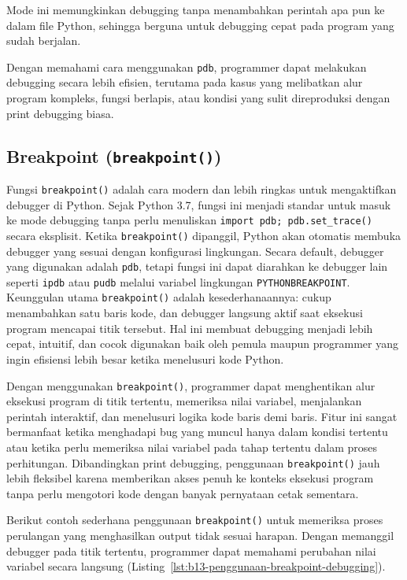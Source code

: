 Mode ini memungkinkan debugging tanpa menambahkan perintah apa pun ke dalam file Python, sehingga berguna untuk debugging cepat pada program yang sudah berjalan.

Dengan memahami cara menggunakan \texttt{pdb}, programmer dapat melakukan debugging secara lebih efisien, terutama pada kasus yang melibatkan alur program kompleks, fungsi berlapis, atau kondisi yang sulit direproduksi dengan print debugging biasa.

\subsection{Breakpoint (\texttt{breakpoint()})}

Fungsi \texttt{breakpoint()} adalah cara modern dan lebih ringkas untuk mengaktifkan debugger di Python. Sejak Python 3.7, fungsi ini menjadi standar untuk masuk ke mode debugging tanpa perlu menuliskan \texttt{import pdb; pdb.set\_trace()} secara eksplisit. Ketika \texttt{breakpoint()} dipanggil, Python akan otomatis membuka debugger yang sesuai dengan konfigurasi lingkungan. Secara default, debugger yang digunakan adalah \texttt{pdb}, tetapi fungsi ini dapat diarahkan ke debugger lain seperti \texttt{ipdb} atau \texttt{pudb} melalui variabel lingkungan \texttt{PYTHONBREAKPOINT}. Keunggulan utama \texttt{breakpoint()} adalah kesederhanaannya: cukup menambahkan satu baris kode, dan debugger langsung aktif saat eksekusi program mencapai titik tersebut. Hal ini membuat debugging menjadi lebih cepat, intuitif, dan cocok digunakan baik oleh pemula maupun programmer yang ingin efisiensi lebih besar ketika menelusuri kode Python.

Dengan menggunakan \texttt{breakpoint()}, programmer dapat menghentikan alur eksekusi program di titik tertentu, memeriksa nilai variabel, menjalankan perintah interaktif, dan menelusuri logika kode baris demi baris. Fitur ini sangat bermanfaat ketika menghadapi bug yang muncul hanya dalam kondisi tertentu atau ketika perlu memeriksa nilai variabel pada tahap tertentu dalam proses perhitungan. Dibandingkan print debugging, penggunaan \texttt{breakpoint()} jauh lebih fleksibel karena memberikan akses penuh ke konteks eksekusi program tanpa perlu mengotori kode dengan banyak pernyataan cetak sementara.

Berikut contoh sederhana penggunaan \texttt{breakpoint()} untuk memeriksa proses perulangan yang menghasilkan output tidak sesuai harapan. Dengan memanggil debugger pada titik tertentu, programmer dapat memahami perubahan nilai variabel secara langsung (Listing~\ref{lst:b13-penggunaan-breakpoint-debugging}).

